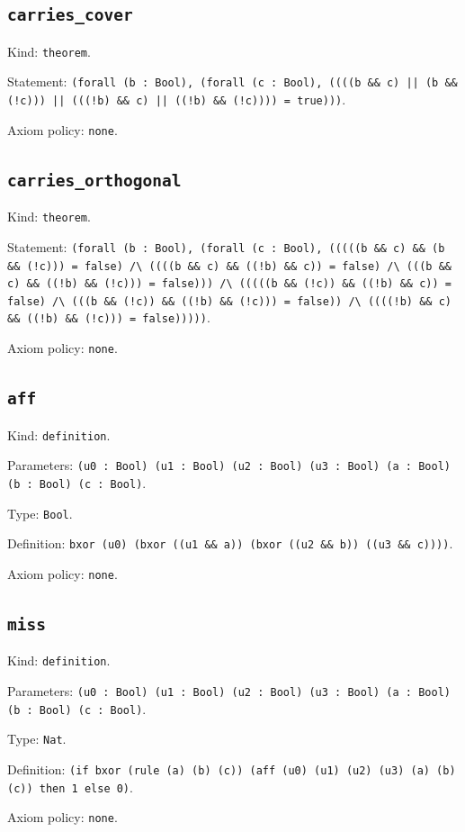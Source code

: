 \documentclass[11pt]{article}
\begin{document}
\subsection*{\texttt{carries\_cover}}
\noindent Kind: \texttt{theorem}.\par
\noindent Statement: \texttt{(forall (b : Bool), (forall (c : Bool), ((((b \&\& c) || (b \&\& (!c))) || (((!b) \&\& c) || ((!b) \&\& (!c)))) = true)))}.\par
\noindent Axiom policy: \texttt{none}.\par
\subsection*{\texttt{carries\_orthogonal}}
\noindent Kind: \texttt{theorem}.\par
\noindent Statement: \texttt{(forall (b : Bool), (forall (c : Bool), (((((b \&\& c) \&\& (b \&\& (!c))) = false) /\textbackslash{} ((((b \&\& c) \&\& ((!b) \&\& c)) = false) /\textbackslash{} (((b \&\& c) \&\& ((!b) \&\& (!c))) = false))) /\textbackslash{} (((((b \&\& (!c)) \&\& ((!b) \&\& c)) = false) /\textbackslash{} (((b \&\& (!c)) \&\& ((!b) \&\& (!c))) = false)) /\textbackslash{} ((((!b) \&\& c) \&\& ((!b) \&\& (!c))) = false)))))}.\par
\noindent Axiom policy: \texttt{none}.\par
\subsection*{\texttt{aff}}
\noindent Kind: \texttt{definition}.\par
\noindent Parameters: \texttt{(u0 : Bool) (u1 : Bool) (u2 : Bool) (u3 : Bool) (a : Bool) (b : Bool) (c : Bool)}.\par
\noindent Type: \texttt{Bool}.\par
\noindent Definition: \texttt{bxor (u0) (bxor ((u1 \&\& a)) (bxor ((u2 \&\& b)) ((u3 \&\& c))))}.\par
\noindent Axiom policy: \texttt{none}.\par
\subsection*{\texttt{miss}}
\noindent Kind: \texttt{definition}.\par
\noindent Parameters: \texttt{(u0 : Bool) (u1 : Bool) (u2 : Bool) (u3 : Bool) (a : Bool) (b : Bool) (c : Bool)}.\par
\noindent Type: \texttt{Nat}.\par
\noindent Definition: \texttt{(if bxor (rule (a) (b) (c)) (aff (u0) (u1) (u2) (u3) (a) (b) (c)) then 1 else 0)}.\par
\noindent Axiom policy: \texttt{none}.\par
\end{document}
